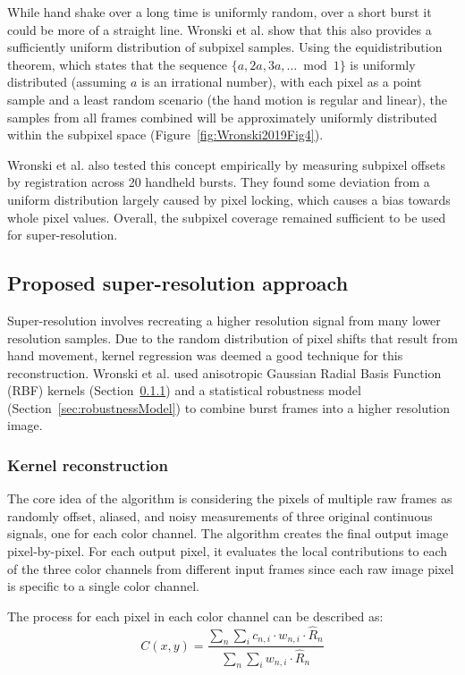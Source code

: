 \documentclass{sig-alternate}
\begin{document}
While hand shake over a long time is uniformly random, over a short burst it could be more of a straight line.
Wronski et al. show that this also provides a sufficiently uniform distribution of subpixel samples.
Using the equidistribution theorem, which states that the sequence $\{a,2a,3a,\dotsc \bmod 1\}$ is uniformly distributed (assuming $a$ is an irrational number), with each pixel as a point sample and a least random scenario (the hand motion is regular and linear), the samples from all frames combined will be approximately uniformly distributed within the subpixel space (Figure~\ref{fig:Wronski2019Fig4}).

Wronski et al. also tested this concept empirically by measuring subpixel offsets by registration across 20 handheld bursts. They found some deviation from a uniform distribution largely caused by pixel locking, which causes a bias towards whole pixel values. Overall, the subpixel coverage remained sufficient to be used for super-resolution.

\subsection{Proposed super-resolution approach}

Super-resolution involves recreating a higher resolution signal from many lower resolution samples. Due to the random distribution of pixel shifts that result from hand movement, kernel regression was deemed a good technique for this reconstruction. Wronski et al. used anisotropic Gaussian Radial Basis Function (RBF) kernels (Section~\ref{sec:kernelReconstruction}) and a statistical robustness model (Section~\ref{sec:robustnessModel}) to combine burst frames into a higher resolution image.

\subsubsection{Kernel reconstruction}
\label{sec:kernelReconstruction}

The core idea of the algorithm is considering the pixels of multiple raw frames as randomly offset, aliased, and noisy measurements of three original continuous signals, one for each color channel. The algorithm creates the final output image pixel-by-pixel. For each output pixel, it evaluates the local contributions to each of the three color channels from different input frames since each raw image pixel is specific to a single color channel. 

The process for each pixel in each color channel can be described as:
\begin{equation}
C(x, y)=\frac{\sum_{n} \sum_{i} c_{n, i} \cdot w_{n, i} \cdot \hat{R}_{n}}{\sum_{n} \sum_{i} w_{n, i} \cdot \hat{R}_{n}}
\end{equation}
\end{document}
